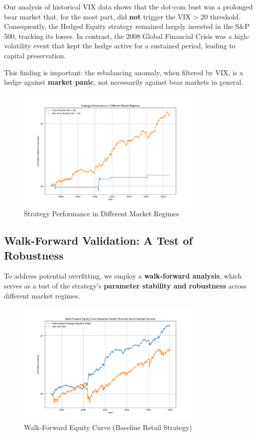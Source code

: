 \documentclass{article}
\begin{document}
Our analysis of historical VIX data shows that the dot-com bust was a prolonged bear market that, for the most part, did \textbf{not} trigger the VIX > 20 threshold. Consequently, the Hedged Equity strategy remained largely invested in the S\&P 500, tracking its losses. In contrast, the 2008 Global Financial Crisis was a high-volatility event that kept the hedge active for a sustained period, leading to capital preservation.

This finding is important: the rebalancing anomaly, when filtered by VIX, is a hedge against \textbf{market panic}, not necessarily against bear markets in general.

\begin{figure}[htbp]
\centering
\includegraphics[width=0.8\textwidth]{plots/plot_crisis_analysis.png}
\caption{Strategy Performance in Different Market Regimes}
\end{figure}

\subsection{Walk-Forward Validation: A Test of Robustness}
To address potential overfitting, we employ a \textbf{walk-forward analysis}, which serves as a test of the strategy's \textbf{parameter stability and robustness} across different market regimes.

\begin{figure}[htbp]
\centering
\includegraphics[width=0.8\textwidth]{plots/plot_walk_forward.png}
\caption{Walk-Forward Equity Curve (Baseline Retail Strategy)}
\label{fig:walk_forward}
\end{figure}
\end{document}
